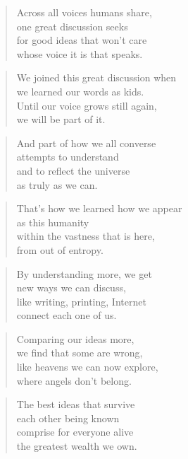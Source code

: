 \documentclass[10pt,a4paper]{article}
\begin{document}
\begin{multicols}{2}
\begin{verse}
Across all voices humans share,\\
one great discussion seeks\\
for good ideas that won’t care\\
whose voice it is that speaks.
\end{verse}

\begin{verse}
We joined this great discussion when\\
we learned our words as kids.\\
Until our voice grows still again,\\
we will be part of it.
\end{verse}

\begin{verse}
And part of how we all converse\\
attempts to understand\\
and to reflect the universe\\
as truly as we can.
\end{verse}

\begin{verse}
That’s how we learned how we appear\\
as this humanity\\
within the vastness that is here,\\
from out of entropy.
\end{verse}

\begin{verse}
By understanding more, we get\\
new ways we can discuss,\\
like writing, printing, Internet\\
connect each one of us.
\end{verse}

\begin{verse}
Comparing our ideas more,\\
we find that some are wrong,\\
like heavens we can now explore,\\
where angels don’t belong.
\end{verse}

\begin{verse}
The best ideas that survive\\
each other being known\\
comprise for everyone alive\\
the greatest wealth we own.
\end{verse}


\end{multicols}
\end{document}
